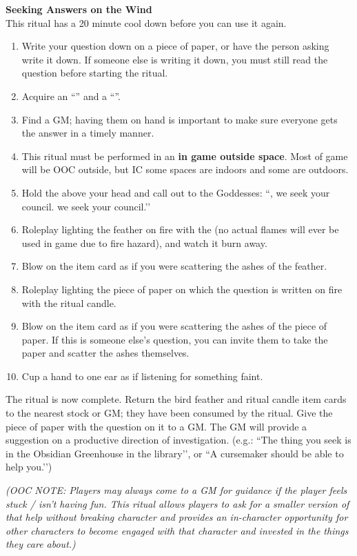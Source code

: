 \documentclass[green]{GL2020}
\begin{document}
\textbf{Seeking Answers on the Wind}\\
This ritual has a 20 minute cool down before you can use it again.
  \begin{enumerate}
    \item Write your question down on a piece of paper, or have the person asking write it down. If someone else is writing it down, you must still read the question before starting the ritual.
    \item Acquire an ``\iEagleFeather{}'' and a ``\iRitualCandle{}''.
		\item Find a GM; having them on hand is important to make sure everyone gets the answer in a timely manner.
		\item This ritual must be performed in an \textbf{in game outside space}. Most of game will be OOC outside, but IC some spaces are indoors and some are outdoors.
		\item Hold the \iEagleFeather{} above your head and call out to the Goddesses: ``\cEbb{\full}, we seek your council. \cFlow{\full} we seek your council.’’
		\item Roleplay lighting the feather on fire with the \iRitualCandle{} (no actual flames will ever be used in game due to fire hazard), and watch it burn away. 
		\item Blow on the item card as if you were scattering the ashes of the feather.
		\item Roleplay lighting the piece of paper on which the question is written on fire with the ritual candle.
		\item Blow on the item card as if you were scattering the ashes of the piece of paper. If this is someone else’s question, you can invite them to take the paper and scatter the ashes themselves.
		\item Cup a hand to one ear as if listening for something faint.
  \end{enumerate}

The ritual is now complete. Return the bird feather and ritual candle item cards to the nearest stock or GM; they have been consumed by the ritual. Give the piece of paper with the question on it to a GM. The GM will provide a suggestion on a productive direction of investigation. (e.g.: ``The thing you seek is in the Obsidian Greenhouse in the library’’, or ``A cursemaker should be able to help you.’’)

\emph{(OOC NOTE: Players may always come to a GM for guidance if the player feels stuck / isn’t having fun. This ritual allows players to ask for a smaller version of that help without breaking character and provides an in-character opportunity for other characters to become engaged with that character and invested in the things they care about.)}
\end{document}

